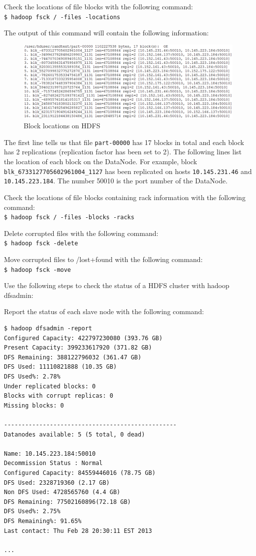 Check the locations of file blocks with the following command: \\
\verb|$ hadoop fsck / -files -locations|

The output of this command will contain the following information:
\begin{figure}[h]
  \centering
  \includegraphics[width=\textwidth]{figs/5163OS_04_07.png}
  \caption{Block locations on HDFS}\label{fig:hdfs.block.locations}
\end{figure} 

The first line tells us that file \verb|part-00000| has 17 blocks in total and each block has 2 replications (replication factor has been set to 2). The following lines list the location of each block on the DataNode. For example, block \verb|blk_6733127705602961004_1127| has been replicated on hosts \verb|10.145.231.46| and \verb|10.145.223.184|. The number 50010 is the port number of the DataNode.

Check the locations of file blocks containing rack information with the following command: \\
\verb|$ hadoop fsck / -files -blocks -racks|

Delete corrupted files with the following command:\\
\verb|$ hadoop fsck -delete|

Move corrupted files to /lost+found with the following command: \\
\verb|$ hadoop fsck -move|

Use the following steps to check the status of a HDFS cluster with hadoop dfsadmin:

Report the status of each slave node with the following command: 
\begin{verbatim}
$ hadoop dfsadmin -report
Configured Capacity: 422797230080 (393.76 GB)
Present Capacity: 399233617920 (371.82 GB)
DFS Remaining: 388122796032 (361.47 GB)
DFS Used: 11110821888 (10.35 GB)
DFS Used%: 2.78%
Under replicated blocks: 0
Blocks with corrupt replicas: 0
Missing blocks: 0

-------------------------------------------------
Datanodes available: 5 (5 total, 0 dead)

Name: 10.145.223.184:50010
Decommission Status : Normal
Configured Capacity: 84559446016 (78.75 GB)
DFS Used: 2328719360 (2.17 GB)
Non DFS Used: 4728565760 (4.4 GB)
DFS Remaining: 77502160896(72.18 GB)
DFS Used%: 2.75%
DFS Remaining%: 91.65%
Last contact: Thu Feb 28 20:30:11 EST 2013

...

\end{verbatim}

